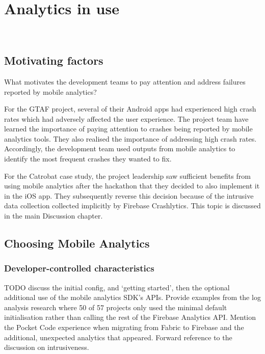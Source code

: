 \chapter{Analytics in use}~\label{chapter-analytics-in-use}

\section{Motivating factors}
What motivates the development teams to pay attention and address failures reported by mobile analytics?

For the GTAF project, several of their Android apps had experienced high crash rates which had adversely affected the user experience. The project team have learned the importance of paying attention to crashes being reported by mobile analytics tools. They also realised the importance of addressing high crash rates. Accordingly, the development team used outputs from mobile analytics to identify the most frequent crashes they wanted to fix.

For the Catrobat case study, the project leadership saw sufficient benefits from using mobile analytics after the hackathon that they decided to also implement it in the iOS app. They subsequently reverse this decision because of the intrusive data collection collected implicitly by Firebase Crashlytics. This topic is discussed in the main Discussion chapter.

\section{Choosing Mobile Analytics}

\subsection{Developer-controlled characteristics}

TODO discuss the initial config, and `getting started', then the optional additional use of the mobile analytics SDK's APIs. Provide examples from the log analysis research where 50 of 57 projects only used the minimal default initialisation rather than calling the rest of the Firebase Analytics API. Mention the Pocket Code experience when migrating from Fabric to Firebase and the additional, unexpected analytics that appeared. Forward reference to the discussion on intrusiveness. 


